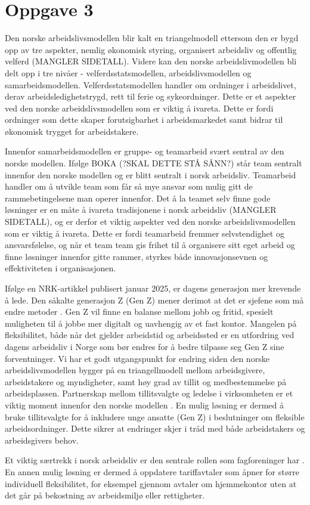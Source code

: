 \section{Oppgave 3}
Den norske arbeidslivsmodellen blir kalt en triangelmodell ettersom den er bygd opp av tre aspekter, nemlig økonomisk styring, organisert arbeidsliv og offentlig velferd \cite{Teknologiledelse} (MANGLER SIDETALL). 
Videre kan den norske arbeidslivmodellen bli delt opp i tre nivåer - velferdsstatsmodellen, arbeidslivsmodellen og samarbeidsmodellen. 
Velferdsstatsmodellen handler om ordninger i arbeidslivet, derav arbeidsledighetstrygd, rett til ferie og sykeordninger. 
Dette er et aspekter ved den norske arbeidslivsmodellen som er viktig å ivareta. Dette er fordi ordninger som dette skaper forutsigbarhet i arbeidsmarkedet samt bidrar til økonomisk trygget for arbeidstakere.
 
Innenfor samarbeidsmodellen er gruppe- og teamarbeid svært sentral av den norske modellen. Ifølge BOKA (?SKAL DETTE STÅ SÅNN?) står team sentralt innenfor den norske modellen og er blitt sentralt i norsk arbeidsliv. 
Teamarbeid handler om å utvikle team som får så mye ansvar som mulig gitt de rammebetingelsene man operer innenfor. 
Det å la teamet selv finne gode løsninger er en måte å ivareta tradisjonene i norsk arbeidsliv \cite{Teknologiledelse} (MANGLER SIDETALL), og er derfor et viktig aspekter ved den norske arbeidslivsmodellen som er viktig å ivareta. 
Dette er fordi teamarbeid fremmer selvstendighet og ansvarsfølelse, og når et team team gis frihet til å organisere sitt eget arbeid og finne løsninger innenfor gitte rammer, styrkes både innovasjonsevnen og effektiviteten i organisasjonen.
 
Ifølge en NRK-artikkel publisert januar 2025, er dagens generasjon mer krevende å lede. Den såkalte generasjon Z (Gen Z) mener derimot at det er sjefene som må endre metoder \cite{NRK}. Gen Z vil finne en balanse mellom jobb og fritid, spesielt muligheten til å jobbe mer digitalt og uavhengig av et fast kontor.  Mangelen på fleksibilitet, både når det gjelder arbeidstid og arbeidssted er en utfordring ved dagens arbeidsliv i Norge som bør endres for å bedre tilpasse seg Gen Z sine forventninger. Vi har et godt utgangspunkt for endring siden den norske arbeidslivsmodellen bygger på en triangellmodell mellom arbeidsgivere, arbeidstakere og myndigheter, samt høy grad av tillit og medbestemmelse på arbeidsplassen. Partnerskap mellom tillitsvalgte og ledelse i virksomheten er et viktig moment innenfor den norske modellen \parencite[229]{Teknologiledelse}. 
En mulig løsning er dermed å bruke tillitsvalgte for å inkludere unge ansatte (Gen Z) i beslutninger om fleksible arbeidsordninger. Dette sikrer at endringer skjer i tråd med både arbeidstakers og arbeidsgivers behov.
 
 
Et viktig særtrekk i norsk arbeidsliv er den sentrale rollen som fagforeninger har \parencite[214]{Teknologiledelse}. En annen mulig løsning er dermed å oppdatere tariffavtaler som åpner for større individuell fleksibilitet, for eksempel gjennom avtaler om hjemmekontor uten at det går på bekostning av arbeidsmiljø eller rettigheter. 